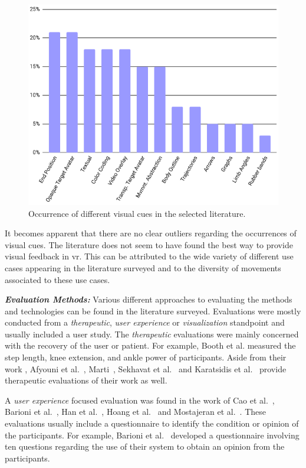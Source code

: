 \begin{figure}[h!tb]
    \centering
    \includegraphics[width=0.8\linewidth]{pictures/CueHistogram.PNG}
    \caption{Occurrence of different visual cues in the selected literature.\label{fig:CueHistogram}}
\end{figure}

It becomes apparent that there are no clear outliers regarding the occurrences of visual cues. The literature does not seem to have found the best way to provide visual feedback in \acrshort{vr}. This can be attributed to the wide variety of different use cases appearing in the literature surveyed and to the diversity of movements associated to these use cases.

\textbf{\emph{Evaluation Methods:}} Various different approaches to evaluating the methods and technologies can be found in the literature surveyed. Evaluations were mostly conducted from a \emph{therapeutic}, \emph{user experience} or \emph{visualization} standpoint and usually included a user study. The \emph{therapeutic} evaluations were mainly concerned with the recovery of the user or patient. For example, Booth et al.\cite{booth2019msr} measured the step length, knee extension, and ankle power of participants. Aside from their work \cite{booth2019msr}\cite{booth2019vue}, Afyouni et al.~\cite{afyouni2020arb}, Marti~\cite{marti2019evl}, Sekhavat et al.~\cite{sekhavat2018pba} and Karatsidis et al.~\cite{karatsidis2018vwv} provide therapeutic evaluations of their work as well.

A \emph{user experience} focused evaluation was found in the work of Cao et al.~\cite{cao2020esa}, Barioni et al.~\cite{barioni2019bvr}, Han et al.~\cite{han2016ara}, Hoang et al.~\cite{hoang2016orp} and Mostajeran et al.~\cite{mostajeran2019hvc}. These evaluations usually include a questionnaire to identify the condition or opinion of the participants. For example, Barioni et al.~\cite{barioni2019bvr} developed a questionnaire involving ten questions regarding the use of their system to obtain an opinion from the participants.

